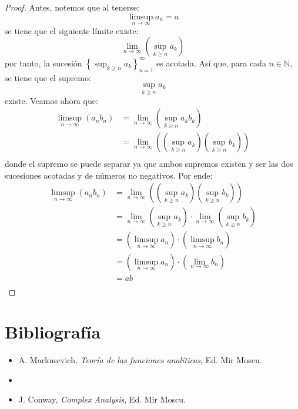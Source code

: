 \documentclass[12pt]{report}
\theoremstyle{largebreak}
\begin{document}
    \begin{proof}
        Antes, notemos que al tenerse:
        \begin{equation*}
            \limsup_{ n\rightarrow\infty}a_n=a
        \end{equation*}
        se tiene que el siguiente límite existe:
        \begin{equation*}
            \lim_{ n\rightarrow\infty}\left(\sup_{ k\geq n}a_k \right)
        \end{equation*}
        por tanto, la sucesión $\left\{\sup_{ k\geq n}a_k\right\}_{ n=1}^\infty$ es acotada. Así que, para cada $n\in\mathbb{N}$, se tiene que el supremo:
        \begin{equation*}
            \sup_{ k\geq n}a_k
        \end{equation*}
        existe. Veamos ahora que:
        \begin{equation*}
            \begin{split}
                \limsup_{ n\rightarrow\infty}(a_nb_n)&=\lim_{ n\rightarrow\infty}\left(\sup_{ k\geq n}a_kb_k \right)\\
                &=\lim_{ n\rightarrow\infty}\left(\left(\sup_{ k\geq n}a_k\right)\left(\sup_{ k\geq n}b_k\right) \right)\\
            \end{split}
        \end{equation*}
        donde el supremo se puede separar ya que ambos supremos existen y ser las dos sucesiones acotadas y de números no negativos. Por ende:
        \begin{equation*}
            \begin{split}
                \limsup_{ n\rightarrow\infty}(a_nb_n)&=\lim_{ n\rightarrow\infty}\left(\left(\sup_{ k\geq n}a_k\right)\left(\sup_{ k\geq n}b_k\right) \right)\\
                &=\lim_{ n\rightarrow\infty}\left(\sup_{ k\geq n} a_k\right)\cdot\lim_{ n\rightarrow\infty}\left(\sup_{ k\geq n}b_k\right)\\
                &=\left(\limsup_{ n\rightarrow\infty}a_n\right)\cdot\left(\limsup_{ n\rightarrow\infty}b_n\right)\\
                &=\left(\limsup_{ n\rightarrow\infty}a_n\right)\cdot\left(\lim_{ n\rightarrow\infty}b_n\right)\\
                &=ab\\
            \end{split}
        \end{equation*}

    \end{proof}

    \chapter*{Bibliografía}

    \begin{itemize}
        \item A. Markusevich, \textit{Teoría de las funciones analíticas}, Ed. Mir Moscu.
        \item \item J. Conway, \textit{Complex Analysis}, Ed. Mir Moscu.
    \end{itemize}
    
\end{document}
